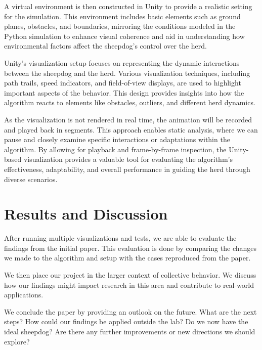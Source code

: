 \documentclass[9pt]{pnas-new}
\begin{document}
A virtual environment is then constructed in Unity to provide a realistic setting for the simulation. This environment includes basic elements such as ground planes, obstacles, and boundaries, mirroring the conditions modeled in the Python simulation to enhance visual coherence and aid in understanding how environmental factors affect the sheepdog’s control over the herd. 

Unity’s visualization setup focuses on representing the dynamic interactions between the sheepdog and the herd. Various visualization techniques, including path trails, speed indicators, and field-of-view displays, are used to highlight important aspects of the behavior. This design provides insights into how the algorithm reacts to elements like obstacles, outliers, and different herd dynamics.

As the visualization is not rendered in real time, the animation will be recorded and played back in segments. This approach enables static analysis, where we can pause and closely examine specific interactions or adaptations within the algorithm. By allowing for playback and frame-by-frame inspection, the Unity-based visualization provides a valuable tool for evaluating the algorithm’s effectiveness, adaptability, and overall performance in guiding the herd through diverse scenarios.

\section*{Results and Discussion}

After running multiple visualizations and tests, we are able to evaluate the findings from the initial paper. This evaluation is done by comparing the changes we made to the algorithm and setup with the cases reproduced from the paper.

We then place our project in the larger context of collective behavior. We discuss how our findings might impact research in this area and contribute to real-world applications.

We conclude the paper by providing an outlook on the future. What are the next steps? How could our findings be applied outside the lab? Do we now have the ideal sheepdog? Are there any further improvements or new directions we should explore?

\begin{multicols}{2}
\section*{\bibname}

\end{multicols}
\end{document}
